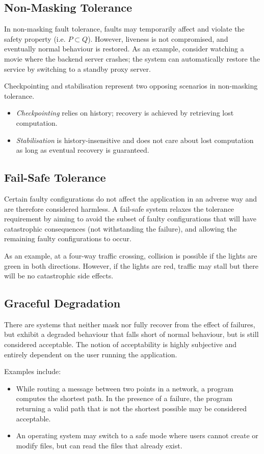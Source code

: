 \subsection{Non-Masking Tolerance}
In non-masking fault tolerance, faults may temporarily affect and violate the safety property (i.e. $P \subset Q$). However, liveness is not compromised, and eventually normal behaviour is restored. As an example, consider watching a movie where the backend server crashes; the system can automatically restore the service by switching to a standby proxy server. 

Checkpointing and stabilisation represent two opposing scenarios in non-masking tolerance.  \begin{itemize}
\item \textit{Checkpointing} relies on history; recovery is achieved by retrieving lost computation.
\item \textit{Stabilisation} is history-insensitive and does not care about lost computation as long as eventual recovery is guaranteed. 
\end{itemize}

\subsection{Fail-Safe Tolerance}
Certain faulty configurations do not affect the application in an adverse way and are therefore considered harmless.  A fail-safe system relaxes the tolerance requirement by aiming to avoid the subset of faulty configurations that will have catastrophic consequences (not withstanding the failure), and allowing the remaining faulty configurations to occur.

As an example, at a four-way traffic crossing, collision is possible if the lights are green in both directions. However, if the lights are red, traffic may stall but there will be no catastrophic side effects.

\subsection{Graceful Degradation}
There are systems that neither mask nor fully recover from the effect of failures, but exhibit a degraded behaviour that falls short of normal behaviour, but is still considered acceptable.  The notion of acceptability is highly subjective and entirely dependent on the user running the application.

Examples include: \begin{itemize}
\item While routing a message between two points in a network, a program computes the shortest path. In the presence of a failure, the program returning a valid path that is not the shortest possible may be considered acceptable.
\item An operating system may switch to a safe mode where users cannot create or modify files, but can read the files that already exist.  
\end{itemize}

